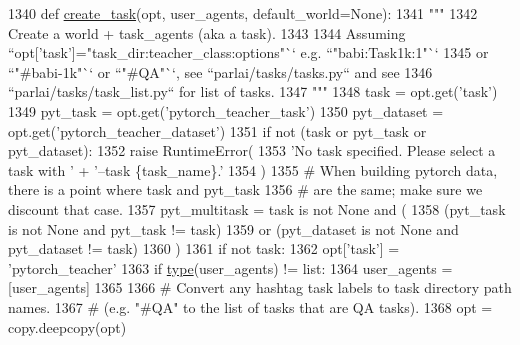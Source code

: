 \begin{DoxyCode}
1340 \textcolor{keyword}{def }\hyperlink{namespaceparlai_1_1core_1_1worlds_a11923c10b545c7ecc1b08fe2242d9c2c}{create\_task}(opt, user\_agents, default\_world=None):
1341     \textcolor{stringliteral}{"""}
1342 \textcolor{stringliteral}{    Create a world + task\_agents (aka a task).}
1343 \textcolor{stringliteral}{}
1344 \textcolor{stringliteral}{    Assuming ``opt['task']="task\_dir:teacher\_class:options"`` e.g. ``"babi:Task1k:1"``}
1345 \textcolor{stringliteral}{    or ``"#babi-1k"`` or ``"#QA"``, see ``parlai/tasks/tasks.py`` and see}
1346 \textcolor{stringliteral}{    ``parlai/tasks/task\_list.py`` for list of tasks.}
1347 \textcolor{stringliteral}{    """}
1348     task = opt.get(\textcolor{stringliteral}{'task'})
1349     pyt\_task = opt.get(\textcolor{stringliteral}{'pytorch\_teacher\_task'})
1350     pyt\_dataset = opt.get(\textcolor{stringliteral}{'pytorch\_teacher\_dataset'})
1351     \textcolor{keywordflow}{if} \textcolor{keywordflow}{not} (task \textcolor{keywordflow}{or} pyt\_task \textcolor{keywordflow}{or} pyt\_dataset):
1352         \textcolor{keywordflow}{raise} RuntimeError(
1353             \textcolor{stringliteral}{'No task specified. Please select a task with '} + \textcolor{stringliteral}{'--task \{task\_name\}.'}
1354         )
1355     \textcolor{comment}{# When building pytorch data, there is a point where task and pyt\_task}
1356     \textcolor{comment}{# are the same; make sure we discount that case.}
1357     pyt\_multitask = task \textcolor{keywordflow}{is} \textcolor{keywordflow}{not} \textcolor{keywordtype}{None} \textcolor{keywordflow}{and} (
1358         (pyt\_task \textcolor{keywordflow}{is} \textcolor{keywordflow}{not} \textcolor{keywordtype}{None} \textcolor{keywordflow}{and} pyt\_task != task)
1359         \textcolor{keywordflow}{or} (pyt\_dataset \textcolor{keywordflow}{is} \textcolor{keywordflow}{not} \textcolor{keywordtype}{None} \textcolor{keywordflow}{and} pyt\_dataset != task)
1360     )
1361     \textcolor{keywordflow}{if} \textcolor{keywordflow}{not} task:
1362         opt[\textcolor{stringliteral}{'task'}] = \textcolor{stringliteral}{'pytorch\_teacher'}
1363     \textcolor{keywordflow}{if} \hyperlink{namespaceparlai_1_1agents_1_1tfidf__retriever_1_1build__tfidf_ad5dfae268e23f506da084a9efb72f619}{type}(user\_agents) != list:
1364         user\_agents = [user\_agents]
1365 
1366     \textcolor{comment}{# Convert any hashtag task labels to task directory path names.}
1367     \textcolor{comment}{# (e.g. "#QA" to the list of tasks that are QA tasks).}
1368     opt = copy.deepcopy(opt)

\end{DoxyCode}
